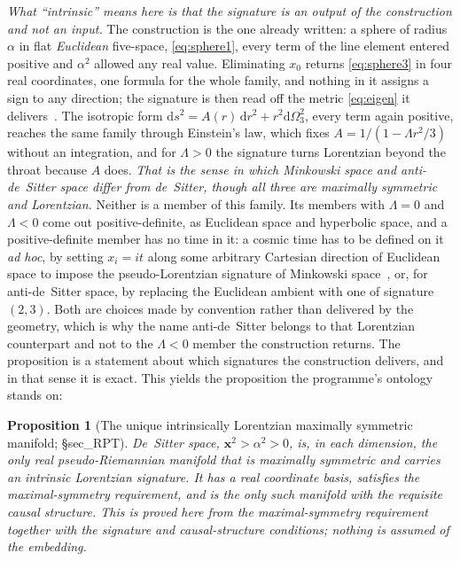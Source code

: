 \documentclass[11pt,a4paper]{article}
\newtheorem{proposition}[theorem]{Proposition}
\theoremstyle{definition}
\begin{document}
\emph{What ``intrinsic'' means here is that the signature is an output of the construction and not an input.} The construction is the one already written: a sphere of radius $\alpha$ in flat \emph{Euclidean} five-space, \eqref{eq:sphere1}, every term of the line element entered positive and $\alpha^{2}$ allowed any real value. Eliminating $x_0$ returns \eqref{eq:sphere3} in four real coordinates, one formula for the whole family, and nothing in it assigns a sign to any direction; the signature is then read off the metric \eqref{eq:eigen} it delivers~\cite[\S sec\_RPT]{JanzenThesis}. The isotropic form $\mathrm{d}s^{2}=A(r)\,\mathrm{d}r^{2}+r^{2}\mathrm{d}\Omega_{3}^{2}$, every term again positive, reaches the same family through Einstein's law, which fixes $A=1/(1-\Lambda r^{2}/3)$ without an integration, and for $\Lambda>0$ the signature turns Lorentzian beyond the throat because $A$ does. \emph{That is the sense in which Minkowski space and anti-de~Sitter space differ from de~Sitter, though all three are maximally symmetric and Lorentzian.} Neither is a member of this family. Its members with $\Lambda=0$ and $\Lambda<0$ come out positive-definite, as Euclidean space and hyperbolic space, and a positive-definite member has no time in it: a cosmic time has to be defined on it \emph{ad hoc}, by setting $x_{i}=it$ along some arbitrary Cartesian direction of Euclidean space to impose the pseudo-Lorentzian signature of Minkowski space~\cite[\S sec\_RPT]{JanzenThesis}, or, for anti-de~Sitter space, by replacing the Euclidean ambient with one of signature $(2,3)$. Both are choices made by convention rather than delivered by the geometry, which is why the name anti-de~Sitter belongs to that Lorentzian counterpart and not to the $\Lambda<0$ member the construction returns. The proposition is a statement about which signatures the construction delivers, and in that sense it is exact. This yields the
proposition the programme's ontology stands on:

\begin{proposition}[The unique intrinsically Lorentzian maximally symmetric
manifold; \cite{JanzenThesis} \S sec\_RPT]\label{prop:unique}
De~Sitter space, $\mathbf{x}^2>\alpha^2>0$, is, in each dimension, the only real
pseudo-Riemannian manifold that is maximally symmetric and carries an intrinsic
Lorentzian signature. It has a real coordinate basis, satisfies the maximal-symmetry
requirement, and is the only such manifold with the requisite causal
structure. This is proved here from the maximal-symmetry requirement together with the signature and causal-structure conditions; nothing is assumed of the embedding.
\end{proposition}
\end{document}

